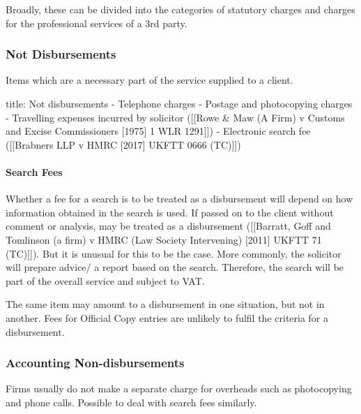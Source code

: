 \documentclass[
]{article}
\newenvironment{Shaded}{}{}
\newcommand{\NormalTok}[1]{#1}
\begin{document}
Broadly, these can be divided into the categories of statutory charges
and charges for the professional services of a 3rd party.

\hypertarget{not-disbursements}{%
\subsubsection{Not Disbursements}\label{not-disbursements}}

Items which are a necessary part of the service supplied to a client.

\begin{Shaded}
\begin{Highlighting}[]
\NormalTok{title: Not disbursements}
\NormalTok{{-} Telephone charges}
\NormalTok{{-} Postage and photocopying charges}
\NormalTok{{-} Travelling expenses incurred by solicitor ([[Rowe \& Maw (A Firm) v Customs and Excise Commissioners [1975] 1 WLR 1291]])}
\NormalTok{{-} Electronic search fee ([[Brabners LLP v HMRC [2017] UKFTT 0666 (TC)]])}
\end{Highlighting}
\end{Shaded}

\hypertarget{search-fees}{%
\paragraph{Search Fees}\label{search-fees}}

Whether a fee for a search is to be treated as a disbursement will
depend on how information obtained in the search is used. If passed on
to the client without comment or analysis, may be treated as a
disbursement ({[}{[}Barratt, Goff and Tomlinson (a firm) v HMRC (Law
Society Intervening) {[}2011{]} UKFTT 71 (TC){]}{]}). But it is unusual
for this to be the case. More commonly, the solicitor will prepare
advice/ a report based on the search. Therefore, the search will be part
of the overall service and subject to VAT.

The same item may amount to a disbursement in one situation, but not in
another. Fees for Official Copy entries are unlikely to fulfil the
criteria for a disbursement.

\hypertarget{accounting-non-disbursements}{%
\subsubsection{Accounting
Non-disbursements}\label{accounting-non-disbursements}}

Firms usually do not make a separate charge for overheads such as
photocopying and phone calls. Possible to deal with search fees
similarly.
\end{document}
